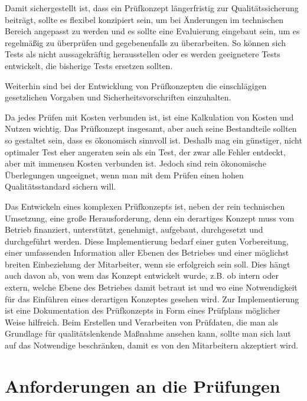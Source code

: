 Damit sichergestellt ist, dass ein Prüfkonzept längerfristig zur Qualitätssicherung beiträgt, sollte es flexibel konzipiert sein, um bei Änderungen im technischen Bereich angepasst zu werden und es sollte eine Evaluierung eingebaut sein, um es regelmäßig zu überprüfen und gegebenenfalls zu überarbeiten. So können sich Tests als nicht aussagekräftig herausstellen oder es werden geeignetere Tests entwickelt, die bisherige Tests ersetzen sollten.


Weiterhin sind bei der Entwicklung von Prüfkonzepten die einschlägigen gesetzlichen Vorgaben und Sicherheitsvorschriften einzuhalten. 


Da jedes Prüfen mit Kosten verbunden ist, ist eine Kalkulation von Kosten und Nutzen wichtig. Das Prüfkonzept insgesamt, aber auch seine Bestandteile sollten so gestaltet sein, dass es ökonomisch sinnvoll ist. Deshalb mag ein günstiger, nicht optimaler Test eher angeraten sein als ein Test, der zwar alle Fehler entdeckt, aber mit immensen Kosten verbunden ist. Jedoch sind rein ökonomische Überlegungen ungeeignet, wenn man mit dem Prüfen einen hohen Qualitätsstandard sichern will.    



Das Entwickeln eines komplexen Prüfkonzepts ist, neben der rein technischen Umsetzung, eine große Herausforderung, denn ein derartiges Konzept muss vom Betrieb finanziert, unterstützt, genehmigt, aufgebaut, durchgesetzt und durchgeführt werden. Diese Implementierung bedarf einer guten Vorbereitung, einer umfassenden Information aller Ebenen des Betriebes und einer möglichst breiten Einbeziehung der Mitarbeiter, wenn sie erfolgreich sein soll. Dies hängt auch davon ab, von wem das Konzept entwickelt wurde, z.B. ob intern oder extern, welche Ebene des Betriebes damit betraut ist und wo eine Notwendigkeit für das Einführen eines derartigen Konzeptes gesehen wird. Zur Implementierung ist eine Dokumentation des Prüfkonzepts in Form eines Prüfplans möglicher Weise hilfreich. Beim  Erstellen und Verarbeiten von Prüfdaten, die man als Grundlage für qualitätslenkende  Maßnahme ansehen kann, sollte man sich laut~\cite{Hering2013} auf das Notwendige beschränken, damit es von den Mitarbeitern akzeptiert wird.



\section{Anforderungen an die Prüfungen}\label{cha:Anforderungen_an_die_Pruefungen}

